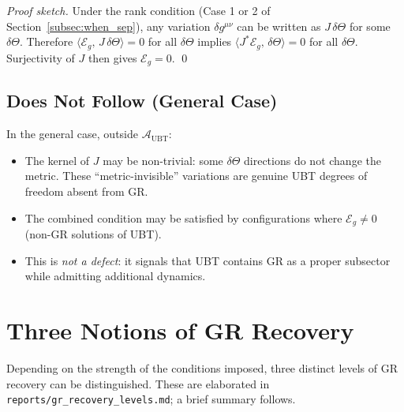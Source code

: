 \documentclass[12pt]{article}
\theoremstyle{definition}
\theoremstyle{remark}
\begin{document}
\begin{proof}[Proof sketch]
Under the rank condition (Case 1 or 2 of Section~\ref{subsec:when_sep}), any
variation $\delta g^{\mu\nu}$ can be written as $J\,\delta\Theta$ for some
$\delta\Theta$.  Therefore $\langle \mathcal{E}_g,\, J\,\delta\Theta \rangle = 0$
for all $\delta\Theta$ implies $\langle J^*\mathcal{E}_g,\, \delta\Theta \rangle = 0$
for all $\delta\Theta$.  Surjectivity of $J$ then gives $\mathcal{E}_g = 0$. \qed
\end{proof}

\subsection{Does Not Follow (General Case)}

In the general case, outside $\mathcal{A}_{\mathrm{UBT}}$:
\begin{itemize}
  \item The kernel of $J$ may be non-trivial: some $\delta\Theta$ directions
    do not change the metric.  These ``metric-invisible'' variations are
    genuine UBT degrees of freedom absent from GR.
  \item The combined condition may be satisfied by configurations where
    $\mathcal{E}_g \neq 0$ (non-GR solutions of UBT).
  \item This is \emph{not a defect}: it signals that UBT contains GR as a
    proper subsector while admitting additional dynamics.
\end{itemize}

\section{Three Notions of GR Recovery}
\label{sec:three_notions}

Depending on the strength of the conditions imposed, three distinct levels of
GR recovery can be distinguished.  These are elaborated in
\texttt{reports/gr\_recovery\_levels.md}; a brief summary follows.
\end{document}
